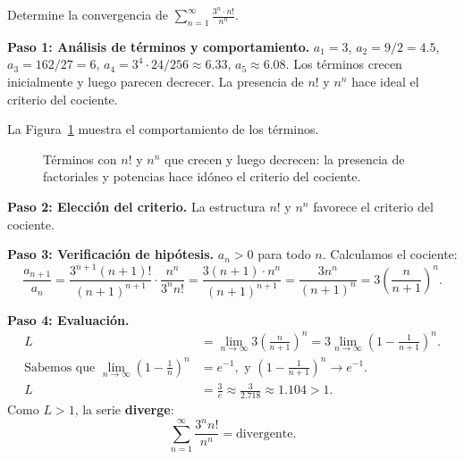 \begin{example}
Determine la convergencia de $\displaystyle\sum_{n=1}^\infty
\frac{3^n \cdot n!}{n^n}$.
\begin{myproof}
\textbf{Paso 1: Análisis de términos y comportamiento.}
$a_1 = 3$, $a_2 = 9/2 = 4.5$, $a_3 = 162/27 = 6$,
$a_4 = 3^4\cdot 24/256 \approx 6.33$, $a_5 \approx 6.08$. Los términos
crecen inicialmente y luego parecen decrecer. La presencia de $n!$ y
$n^n$ hace ideal el criterio del cociente.

La Figura~\ref{fig:terminos_criterio_cociente} muestra el comportamiento de los términos.

\begin{figure}[H]
\centering
{}
\caption{Términos con $n!$ y $n^n$ que crecen y luego decrecen: la presencia de factoriales y potencias hace idóneo el criterio del cociente.}
\label{fig:terminos_criterio_cociente}
\end{figure}

\textbf{Paso 2: Elección del criterio.}
La estructura $n!$ y $n^n$ favorece el criterio del cociente.

\textbf{Paso 3: Verificación de hipótesis.}
$a_n > 0$ para todo $n$. Calculamos el cociente:
\[
  \frac{a_{n+1}}{a_n}
  = \frac{3^{n+1}(n+1)!}{(n+1)^{n+1}}\cdot\frac{n^n}{3^n n!}
  = \frac{3(n+1)\cdot n^n}{(n+1)^{n+1}}
  = \frac{3n^n}{(n+1)^n}
  = 3\left(\frac{n}{n+1}\right)^n.
\]

\textbf{Paso 4: Evaluación.}
\begin{align*}
  L &= \lim_{n\to\infty} 3\left(\frac{n}{n+1}\right)^n
     = 3\lim_{n\to\infty}\left(1-\frac{1}{n+1}\right)^n. \\
  \text{Sabemos que } \lim_{n\to\infty}\left(1-\frac{1}{n}\right)^n
    &= e^{-1},
  \text{ y } \left(1-\tfrac{1}{n+1}\right)^n \to e^{-1}. \\
  L &= \frac{3}{e} \approx \frac{3}{2.718} \approx 1.104 > 1.
\end{align*}
Como $L > 1$, la serie \textbf{diverge}:
\[
  \sum_{n=1}^\infty \frac{3^n n!}{n^n} = \boxed{\text{divergente.}}
\]
\end{myproof}
\end{example}

